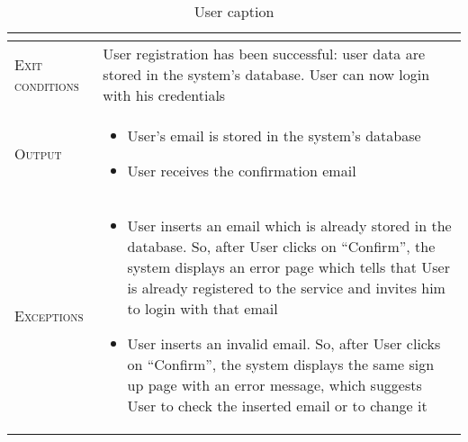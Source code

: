 \begin{table}[H]
\begin{tabular}[c]{|l|p{}|}
\begin{itemize}
                                        \end{itemize}\\
        \hline %
        \textsc{Exit conditions}    &  User registration has been successful: user data are stored in the system’s database. User can now login with his credentials\\
    	\hline %
    	\textsc{Output}             &  \begin{itemize}
    	    \item User’s email is stored in the system’s database
            \item User receives the confirmation email

    	\end{itemize}\\
    	\hline %
    	\textsc{Exceptions}         &  \begin{itemize}
    	    \item User inserts an email which is already stored in the database. So, after User clicks on “Confirm”, the system displays an error page which tells that User is already registered to the service and invites him to login with that email
            \item User inserts an invalid email. So, after User clicks on “Confirm”, the system displays the same sign up page with an error message, which suggests User to check the inserted email or to change it

    	\end{itemize}\\
    	\hline %
        
    \end{tabular}
    \caption{\label{tab:responsible_area_insertion}User caption }
\end{table}

